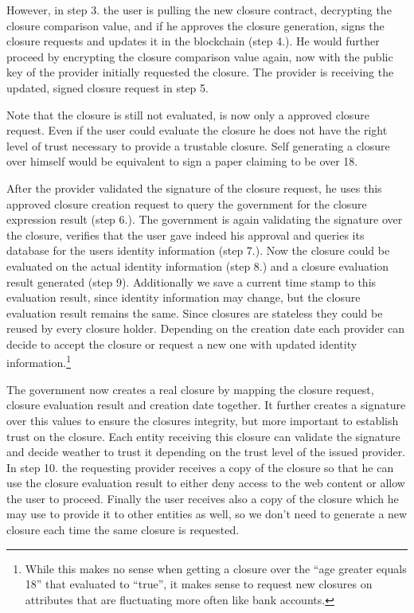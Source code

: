 However, in step 3. the user is pulling the new closure contract, decrypting the closure comparison value, and if he approves the closure generation, signs the closure requests and updates it in the blockchain (step 4.). He would further proceed by encrypting the closure comparison value again, now with the public key of the provider initially requested the closure. The provider is receiving the updated, signed closure request in step 5. 

Note that the closure is still not evaluated, is now only a approved closure request. Even if the user could evaluate the closure he does not have the right level of trust necessary to provide a trustable closure. Self generating a closure over himself would be equivalent to sign a paper claiming to be over 18. 

After the provider validated the signature of the closure request, he uses this approved closure creation request to query the government for the closure expression result (step 6.). The government is again validating the signature over the closure, verifies that the user gave indeed his approval and queries its database for the users identity information (step 7.). Now the closure could be evaluated on the actual identity information (step 8.) and a closure evaluation result generated (step 9). Additionally we save a current time stamp to this evaluation result, since identity information may change, but the closure evaluation result remains the same. Since closures are stateless they could be reused by every closure holder. Depending on the creation date each provider can decide to accept the closure or request a new one with updated identity information.\footnote{While this makes no sense when getting a closure over the “age greater equals 18” that evaluated to “true”, it makes sense to request new closures on attributes that are fluctuating more often like bank accounts.} 

The government now creates a real closure by mapping the closure request, closure evaluation result and creation date together. It further creates a signature over this values to ensure the closures integrity, but more important to establish trust on the closure. Each entity receiving this closure can validate the signature and decide weather to trust it depending on the trust level of the issued provider. In step 10. the requesting provider receives a copy of the closure so that he can use the closure evaluation result to either deny access to the web content or allow the user to proceed. Finally the user receives also a copy of the closure which he may use to provide it to other entities as well, so we don’t need to generate a new closure each time the same closure is requested. 

